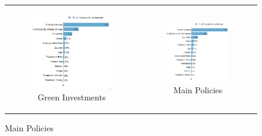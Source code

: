 \documentclass{article}
\begin{document}
\begin{figure}[h!]
\begin{center}
	\begin{tabular}{cc}
		\begin{subfigure}{0.5\textwidth}
		\caption{Green Investments}
			\includegraphics[width=\textwidth]{lmg_investments_socio_non_standardized}
		\end{subfigure}&
		\begin{subfigure}{0.5\textwidth}
		\caption{Main Policies}
			\includegraphics[width=\textwidth]{lmg_main_policies_socio_non_standardized}
		\end{subfigure}\\
	\end{tabular}
\end{center}
\end{figure}
\end{document}
